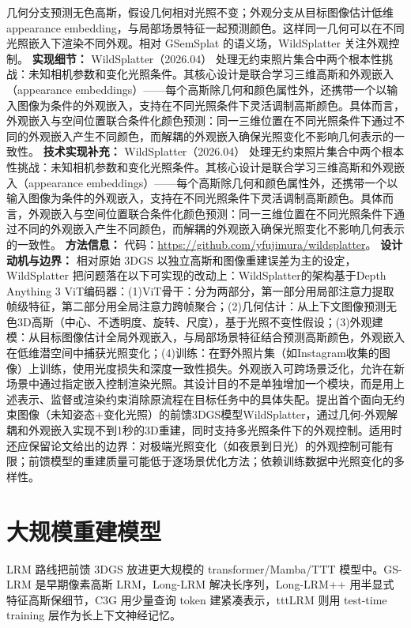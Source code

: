 几何分支预测无色高斯，假设几何相对光照不变；外观分支从目标图像估计低维 appearance embedding，与局部场景特征一起预测颜色。这样同一几何可以在不同光照嵌入下渲染不同外观。相对 GSemSplat 的语义场，WildSplatter 关注外观控制。
\textbf{实现细节：} WildSplatter（2026.04） 处理无约束照片集合中两个根本性挑战：未知相机参数和变化光照条件。其核心设计是联合学习三维高斯和外观嵌入（appearance embeddings）——每个高斯除几何和颜色属性外，还携带一个以输入图像为条件的外观嵌入，支持在不同光照条件下灵活调制高斯颜色。具体而言，外观嵌入与空间位置联合条件化颜色预测：同一三维位置在不同光照条件下通过不同的外观嵌入产生不同颜色，而解耦的外观嵌入确保光照变化不影响几何表示的一致性。
\textbf{技术实现补充：} WildSplatter（2026.04） 处理无约束照片集合中两个根本性挑战：未知相机参数和变化光照条件。其核心设计是联合学习三维高斯和外观嵌入（appearance embeddings）——每个高斯除几何和颜色属性外，还携带一个以输入图像为条件的外观嵌入，支持在不同光照条件下灵活调制高斯颜色。具体而言，外观嵌入与空间位置联合条件化颜色预测：同一三维位置在不同光照条件下通过不同的外观嵌入产生不同颜色，而解耦的外观嵌入确保光照变化不影响几何表示的一致性。
\textbf{方法信息：} 代码：\url{https://github.com/yfujimura/wildsplatter}。
\textbf{设计动机与边界：} 相对原始 3DGS 以独立高斯和图像重建误差为主的设定，WildSplatter 把问题落在以下可实现的改动上：WildSplatter的架构基于Depth Anything 3 ViT编码器：(1)ViT骨干：分为两部分，第一部分用局部注意力提取帧级特征，第二部分用全局注意力跨帧聚合；(2)几何估计：从上下文图像预测无色3D高斯（中心、不透明度、旋转、尺度），基于光照不变性假设；(3)外观建模：从目标图像估计全局外观嵌入，与局部场景特征结合预测高斯颜色，外观嵌入在低维潜空间中捕获光照变化；(4)训练：在野外照片集（如Instagram收集的图像）上训练，使用光度损失和深度一致性损失。外观嵌入可跨场景泛化，允许在新场景中通过指定嵌入控制渲染光照。其设计目的不是单独增加一个模块，而是用上述表示、监督或渲染约束消除原流程在目标任务中的具体失配。提出首个面向无约束图像（未知姿态+变化光照）的前馈3DGS模型WildSplatter，通过几何-外观解耦和外观嵌入实现不到1秒的3D重建，同时支持多光照条件下的外观控制。适用时还应保留论文给出的边界：对极端光照变化（如夜景到日光）的外观控制可能有限；前馈模型的重建质量可能低于逐场景优化方法；依赖训练数据中光照变化的多样性。

\section{大规模重建模型}

LRM 路线把前馈 3DGS 放进更大规模的 transformer/Mamba/TTT 模型中。GS-LRM 是早期像素高斯 LRM，Long-LRM 解决长序列，Long-LRM++ 用半显式特征高斯保细节，C3G 用少量查询 token 建紧凑表示，tttLRM 则用 test-time training 层作为长上下文神经记忆。
